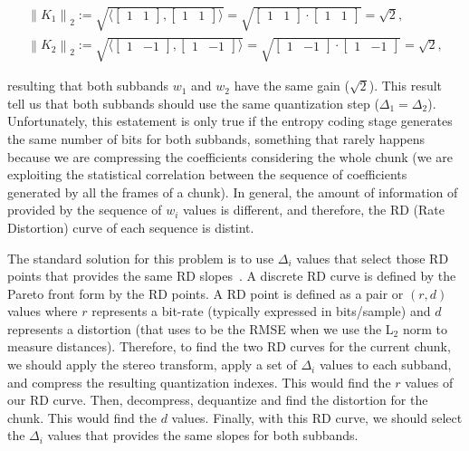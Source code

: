 \begin{equation}
  \begin{array}{l}
    \left\| K_1 \right\|_2 := \sqrt{\langle \begin{bmatrix}1 & 1\end{bmatrix}, \begin{bmatrix}1 & 1\end{bmatrix} \rangle} = \sqrt{\begin{bmatrix}1 & 1\end{bmatrix}\cdot \begin{bmatrix}1 & 1\end{bmatrix}} = \sqrt{2},\\
    \left\| K_2 \right\|_2 := \sqrt{\langle \begin{bmatrix}1 & -1\end{bmatrix}, \begin{bmatrix}1 & -1\end{bmatrix} \rangle} = \sqrt{\begin{bmatrix}1 & -1\end{bmatrix}\cdot \begin{bmatrix}1 & -1\end{bmatrix}} = \sqrt{2},
  \end{array}
\end{equation}

resulting that both subbands $w_1$ and $w_2$ have the same gain
($\sqrt{2}$). This result tell us that both subbands should use the
same quantization step ($\Delta_1=\Delta_2$). Unfortunately, this
estatement is only true if the entropy coding stage generates the same
number of bits for both subbands, something that rarely happens
because we are compressing the coefficients considering the whole
chunk (we are exploiting the statistical correlation between the
sequence of coefficients generated by all the frames of a chunk). In
general, the amount of information of provided by the sequence of
$w_i$ values is different, and therefore, the RD (Rate Distortion)
curve of each sequence is distint.

The standard solution for this problem is to use $\Delta_i$ values
that select those RD points that provides the same RD
slopes~\cite{vetterli2014foundations, sayood2017introduction}. A
discrete RD curve is defined by the Pareto front form by the RD
points. A RD point is defined as a pair or $(r,d)$ values where $r$
represents a bit-rate (typically expressed in bits/sample) and $d$
represents a distortion (that uses to be the RMSE when we use the
L$_2$ norm to measure distances). Therefore, to find the two RD curves
for the current chunk, we should apply the stereo transform, apply a
set of $\Delta_i$ values to each subband, and compress the resulting
quantization indexes. This would find the $r$ values of our RD
curve. Then, decompress, dequantize and find the distortion for the
chunk. This would find the $d$ values. Finally, with this RD curve, we
should select the $\Delta_i$ values that provides the same slopes for
both subbands.

